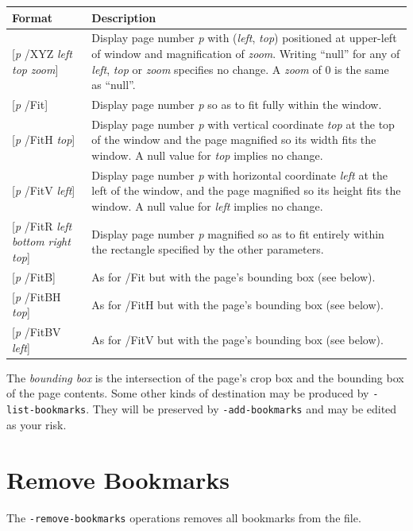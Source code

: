 \documentclass{book}
\begin{document}
\begin{tabular}{lp{8cm}}
Format & Description\\\hline
{[\textit{p} /XYZ \textit{left} \textit{top} \textit{zoom}]} & Display page number \textit{p} with (\textit{left}, \textit{top}) positioned at upper-left of window and magnification of \textit{zoom}. Writing ``null'' for any of \textit{left}, \textit{top} or \textit{zoom} specifies no change. A \textit{zoom} of 0 is the same as ``null''.\\
{[\textit{p} /Fit]} & Display page number \textit{p} so as to fit fully within the window.\\
{[\textit{p} /FitH \textit{top}]} & Display page number \textit{p} with vertical coordinate \textit{top} at the top of the window and the page magnified so its width fits the window. A null value for \textit{top} implies no change.\\
{[\textit{p} /FitV \textit{left}]} & Display page number \textit{p} with horizontal coordinate \textit{left} at the left of the window, and the page magnified so its height fits the window. A null value for \textit{left} implies no change. \\
{[\textit{p} /FitR \textit{left} \textit{bottom} \textit{right} \textit{top}]} & Display page number \textit{p} magnified so as to fit entirely within the rectangle specified by the other parameters. \\
{[\textit{p} /FitB]} & As for /Fit but with the page's bounding box (see below).\\
{[\textit{p} /FitBH \textit{top}]} & As for /FitH but with the page's bounding box (see below).\\
{[\textit{p} /FitBV \textit{left}]} & As for /FitV but with the page's bounding box (see below).
\end{tabular}

\medskip

\noindent The \textit{bounding box} is the intersection of the page's crop box and the bounding box of the page contents. Some other kinds of destination may be produced by \texttt{-list-bookmarks}. They will be preserved by \texttt{-add-bookmarks} and may be edited as your risk.


  \section{Remove Bookmarks}
  \label{removebookmarks}

  The \texttt{-remove-bookmarks} operations removes all bookmarks from the file.
\end{document}
